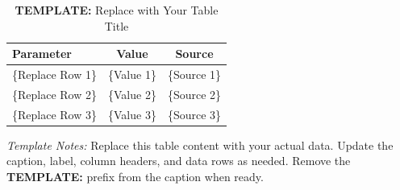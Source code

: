 \documentclass[\latexroot/\projectname]{subfiles}
\begin{document}

\begin{table}[h]
  \centering
  \caption{{\bf TEMPLATE:} Replace with Your Table Title\whenintegrated{\label{tab:template}}}
  \begin{tabular}{lcc}
    \hline
    \textbf{Parameter} & \textbf{Value} & \textbf{Source} \\
    \hline
    \{Replace Row 1\}  & \{Value 1\}    & \{Source 1\}    \\
    \{Replace Row 2\}  & \{Value 2\}    & \{Source 2\}    \\
    \{Replace Row 3\}  & \{Value 3\}    & \{Source 3\}    \\
    \hline
  \end{tabular}
  \begin{flushleft}
    \footnotesize
    \textit{Template Notes:} Replace this table content with your actual data.
    Update the caption, label, column headers, and data rows as needed.
    Remove the {\bf TEMPLATE:} prefix from the caption when ready.
  \end{flushleft}
\end{table}

\smartbib
\end{document}
